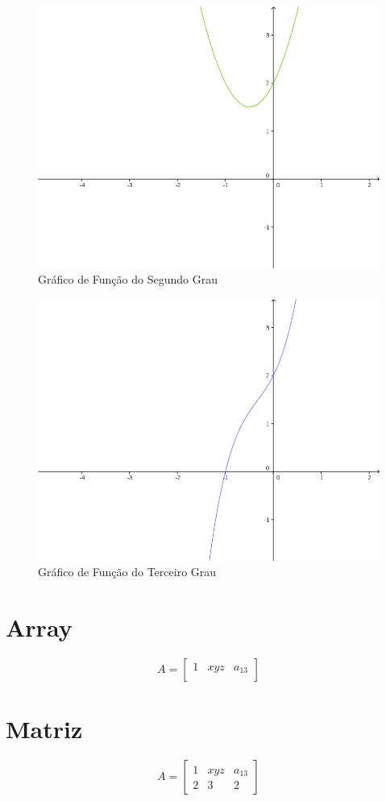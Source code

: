 \documentclass[12pt,a4paper,titlepage]{article}
\begin{document}
\begin{figure}[!h]
\centering
\includegraphics[width=0.7\linewidth]{./segundograu}
\caption{Gráfico de Função do Segundo Grau}
\label{fig:segundograu}
\end{figure}

\begin{figure}[!h]
\centering
\includegraphics[width=0.7\linewidth]{./terceirograu}
\caption{Gráfico de Função do Terceiro Grau}
\label{fig:terceirograu}
\end{figure}

\newpage

\section{Array}
$$
A = \left[
\begin{array}{cccc}
	1 & xyz & a_{13} \\
\end{array} 
\right]
$$	
	
	
\section{Matriz}
$$
A = \left[
\begin{array}{cccc}
	1 & xyz & a_{13} \\
	2 & 3 & 2
\end{array} 
\right]
$$	
\end{document}
